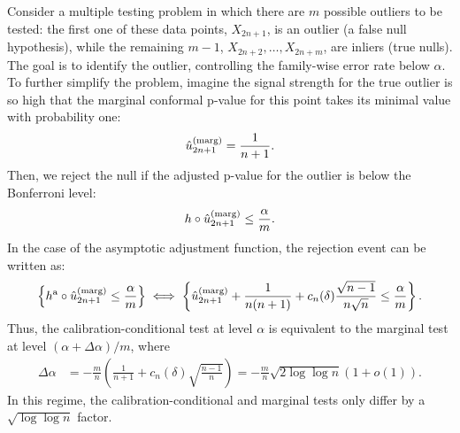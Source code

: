 \documentclass[11pt]{article}
\def\marg{\textnormal{(marg)}}
\renewcommand{\P}{\mathbb{P}}
\begin{document}
Consider a multiple testing problem in which there are $m$ possible outliers to be tested: the first one of these data points, $X_{2n+1}$, is an outlier (a false null hypothesis), while the remaining $m-1$, $X_{2n+2},\ldots,X_{2n+m}$, are inliers (true nulls). The goal is to identify the outlier, controlling the family-wise error rate below $\alpha$. To further simplify the problem, imagine the signal strength for the true outlier is so high that the marginal conformal p-value for this point takes its minimal value with probability one:
\begin{align*}
\hat{u}^\marg_{2n+1} = \frac{1}{n+1}.
\end{align*}
Then, we reject the null if the adjusted p-value for the outlier is below the Bonferroni level:
\begin{align} \label{eq:power-needle-generic}
  h \circ \hat{u}^\marg_{2n+1} \leq \frac{\alpha}{m}.
\end{align}
In the case of the asymptotic adjustment function, the rejection event can be written as:
\begin{align*}
  \left\{ h^{\mathrm{a}} \circ \hat{u}^\marg_{2n+1} \leq \frac{\alpha}{m} \right\}
   \iff 
   \left\{\hat{u}^\marg_{2n+1} + \frac{1}{n(n+1)} + c_n(\delta) \frac{\sqrt{n-1}}{n \sqrt{n}}  \leq \frac{\alpha}{m}\right\}.
\end{align*}
Thus, the calibration-conditional test at level $\alpha$ is equivalent to the marginal test at level $(\alpha + \Delta \alpha)/m$, where
\begin{align*}
  \Delta \alpha 
  & = - \frac{m}{n} \left( \frac{1}{n+1} + c_n(\delta) \sqrt{\frac{n-1}{n}} \right)
    = - \frac{m}{n} \sqrt{2 \log \log n} (1 + o(1)).
\end{align*}
In this regime, the calibration-conditional and marginal tests only differ by a $\sqrt{\log\log n}$ factor. 
\end{document}
